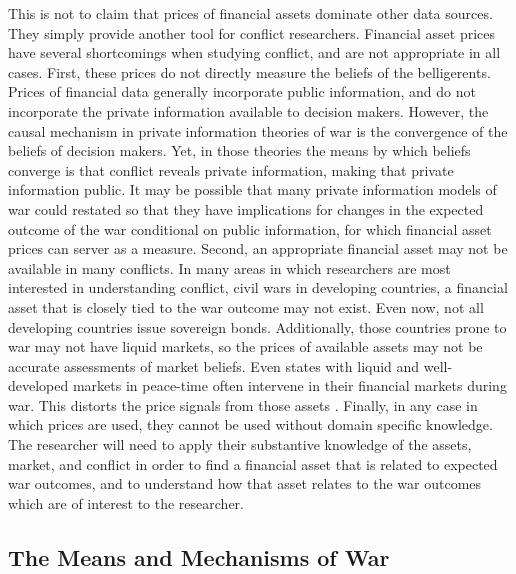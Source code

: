 This is not to claim that prices of financial assets dominate other data sources.
They simply provide another tool for conflict researchers.
Financial asset prices have several shortcomings when studying conflict, and are not appropriate in all cases.
First, these prices do not directly measure the beliefs of the belligerents.
Prices of financial data generally incorporate public information, and do not incorporate the private information available to decision makers.
However, the causal mechanism in private information theories of war is the convergence of the beliefs of decision makers.
Yet, in those theories the means by which beliefs converge is that conflict reveals private information, making that private information public.
It may be possible that many private information models of war could restated so that they have implications for changes in the expected outcome of the war conditional on public information, for which financial asset prices can server as a measure.
Second, an appropriate financial asset may not be available in many conflicts.
In many areas in which researchers are most interested in understanding conflict, \eg{} civil wars in developing countries, a financial asset  that is closely tied to the war outcome may not exist.
Even now, not all developing countries issue sovereign bonds.
Additionally, those countries prone to war may not have liquid markets, so the prices of available assets may not be accurate assessments of market beliefs.
Even states with liquid and well-developed markets in peace-time often intervene in their financial markets during war.
This distorts the price signals from those assets \parencite[12]{HaberMitchenerOosterlinckEtAl2015}.
Finally, in any case in which prices are used, they cannot be used without domain specific knowledge.
The researcher will need to apply their substantive knowledge of the assets, market, and conflict in order to find a financial asset that is related to expected war outcomes, and to understand how that asset relates to the war outcomes which are of interest to the researcher.



\subsection{The Means and Mechanisms of War}
\label{sec:means-mechanisms-war}

